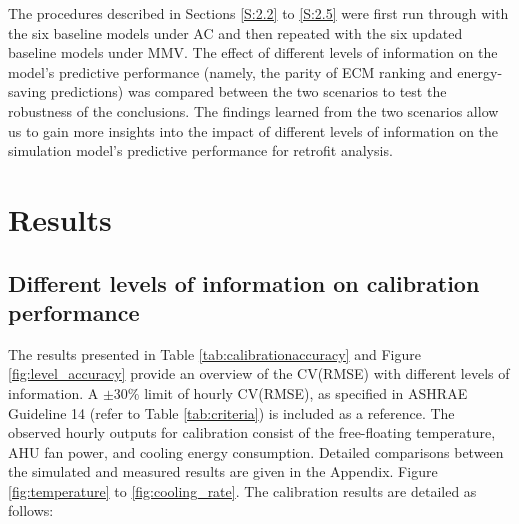 \documentclass[3p,times,12pt]{elsarticle}
\begin{document}
\begin{sloppypar}
The procedures described in Sections \ref{S:2.2} to \ref{S:2.5} were first run through with the six baseline models under AC and then repeated with the six updated baseline models under MMV. The effect of different levels of information on the model’s predictive performance (namely, the parity of ECM ranking and energy-saving predictions) was compared between the two scenarios to test the robustness of the conclusions. The findings learned from the two scenarios allow us to gain more insights into the impact of different levels of information on the simulation model's predictive performance for retrofit analysis.


\section{Results}
\label{S:3}

\subsection{Different levels of information on calibration performance}
\label{S:3.1}
The results presented in Table \ref{tab:calibrationaccuracy} and Figure \ref{fig:level_accuracy} provide an overview of the CV(RMSE) with different levels of information. A $\pm$30\% limit of hourly CV(RMSE), as specified in ASHRAE Guideline 14 \cite{guideline200214} (refer to Table \ref{tab:criteria}) is included as a reference. The observed hourly outputs for calibration consist of the free-floating temperature, AHU fan power, and cooling energy consumption. Detailed comparisons between the simulated and measured results are given in the Appendix. Figure \ref{fig:temperature} to \ref{fig:cooling_rate}. The calibration results are detailed as follows:


\end{sloppypar}
\end{document}
